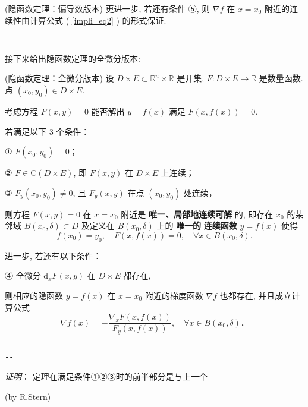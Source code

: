 \begin{theorem}{(隐函数定理：偏导数版本)}
更进一步, 若还有条件 ⑤, 则 $\nabla f$ 在 $x=x_{0}$ 附近的连续性由计算公式 ( \autoref{impli_eq2} ) 的形式保证. 
 \end{theorem}

\verb| |

接下来给出隐函数定理的全微分版本:
 \begin{theorem}{(隐函数定理：全微分版本)}
 设 $D\times E\subset\mathbb{R}^{n}\times\mathbb{R}$ 是开集, $F:D\times E\rightarrow\mathbb{R}$
是数量函数. 点 $(x_{0},y_{0})\in D\times E.$ 

考虑方程 $F(x,y)=0$ 能否解出 $y=f(x)$ 满足 $F(x,f(x))=0.$ 

若满足以下 3 个条件：

① $F(x_{0},y_{0})=0$；

② $F\in\mathrm{C}(D\times E)$, 即 $F(x,y)$ 在 $D\times E$ 上连续； 

③ $F_{y}(x_{0},y_{0})\neq0$, 且 $F_{y}(x,y)$ 在点 $(x_0,y_0)$ 处连续，

则方程 $F(x,y)=0$ 在 $x=x_{0}$ 附近是\textbf{ 唯一、局部地连续可解} 的, 即存在 $x_{0}$
的某邻域 $B(x_{0},\delta)\subset D$ 及定义在 $B(x_{0},\delta)$ 上的 \textbf{唯一的} \textbf{
连续函数} $y=f(x)$ 使得
\[
f(x_{0})=y_{0},\quad F(x,f(x))=0,\quad\forall x\in B(x_{0},\delta).
\]

进一步, 若还有以下条件：

④ 全微分 $\mathrm{d}_{x}F(x,y)$ 在 $D\times E$ 都存在, 

则相应的隐函数 $y=f(x)$ 在 $x=x_{0}$ 附近的梯度函数 $\nabla f$ 也都存在, 并且成立计算公式
\[
\nabla f(x)=-{\displaystyle \frac{\nabla_{x}F(x,f(x))}{F_{y}(x,f(x))}},\quad\forall x\in B(x_{0},\delta)．
\]

\verb|------------------------------------------------------------------------|

\textsl{证明}： 定理在满足条件①②③时的前半部分是与上一个 
 \end{theorem}
(by R.Stern)
